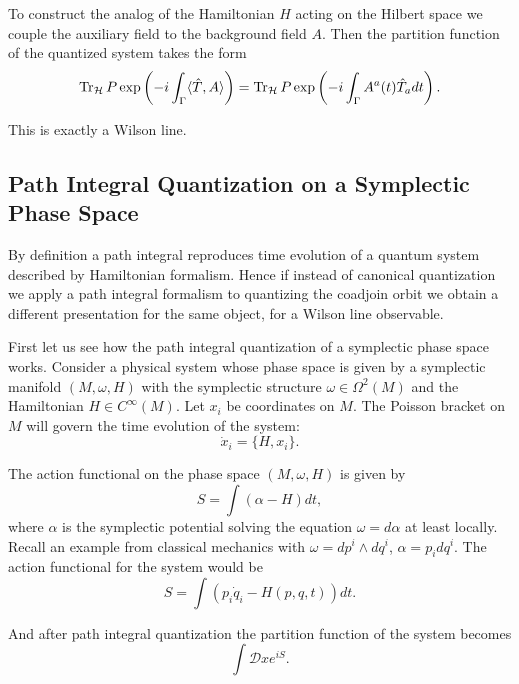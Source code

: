 \documentclass[11pt]{report}
\theoremstyle{plain}
\theoremstyle{definition}
\theoremstyle{remark}
\theoremstyle{remark}
\numberwithin{equation}{section}
\begin{document}
To construct the analog of the Hamiltonian $H$ acting on the Hilbert space we couple the auxiliary field to the background field $A$. Then the partition function of the quantized system takes the form 
\begin{equation}
{\rm Tr}_{\mathcal{H}} \, P\exp\left( -i\int_\Gamma \langle \hat{T}, A\rangle\right) = {\rm Tr}_{\mathcal{H}} \, P\exp\left( -i\int_\Gamma A^a(t)\hat{T}_a dt\right).
\end{equation}

This is exactly a Wilson line. 



\subsection{Path Integral Quantization on a Symplectic Phase Space}

By definition a path integral reproduces time evolution of a quantum system described by Hamiltonian formalism. Hence if instead of canonical quantization we apply a path integral formalism to quantizing the coadjoin orbit we obtain a different presentation for the same object, for a Wilson line observable. 

First let us see how the path integral quantization of a symplectic phase space works. 
Consider a physical system whose phase space is given by a symplectic manifold $(M, \omega, H)$ with the symplectic structure $\omega\in \Omega^2(M)$ and the Hamiltonian $H\in C^\infty(M)$. Let $x_i$ be coordinates on $M$. The Poisson bracket on $M$ will govern the time evolution of the system:
\begin{equation}
\dot{x}_i = \{H, x_i\}.
\end{equation}

The action functional on the phase space $(M, \omega, H)$ is given by
\begin{equation}\label{action}
S = \int (\alpha - H) dt,
\end{equation}
where $\alpha$ is the symplectic potential solving the equation $\omega = d\alpha$ at least locally. 
Recall an example from classical mechanics with $\omega = dp^i \wedge dq^i$, $\alpha = p_i dq^i$. The action functional for the system would be 
$$
S = \int \left( p_i \dot{q}_i - H(p, q, t)\right) dt.
$$

And after path integral quantization the partition function of the system becomes
\begin{equation}
\int \mathcal{D}x e^{iS}.
\end{equation}
\end{document}
